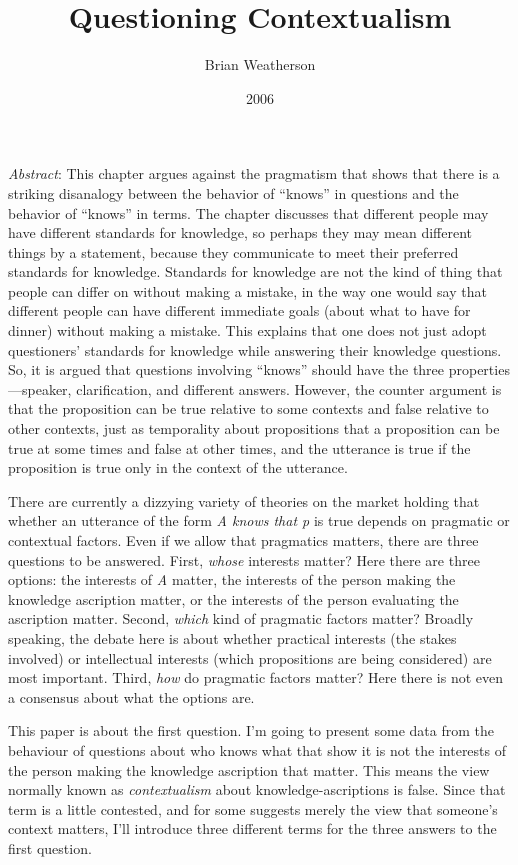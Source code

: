 \documentclass[
  11pt,
  letterpaper,
  DIV=11,
  numbers=noendperiod,
  twoside]{scrartcl}
\title{Questioning Contextualism}
\author{Brian Weatherson}
\date{2006}
\renewenvironment{abstract}
 {\vspace{-1.25cm}
 \quotation\small\noindent\emph{Abstract}:}
 {\endquotation}
\begin{document}
\maketitle
\begin{abstract}
This chapter argues against the pragmatism that shows that there is a
striking disanalogy between the behavior of ``knows'' in questions and
the behavior of ``knows'' in terms. The chapter discusses that different
people may have different standards for knowledge, so perhaps they may
mean different things by a statement, because they communicate to meet
their preferred standards for knowledge. Standards for knowledge are not
the kind of thing that people can differ on without making a mistake, in
the way one would say that different people can have different immediate
goals (about what to have for dinner) without making a mistake. This
explains that one does not just adopt questioners' standards for
knowledge while answering their knowledge questions. So, it is argued
that questions involving ``knows'' should have the three
properties---speaker, clarification, and different answers. However, the
counter argument is that the proposition can be true relative to some
contexts and false relative to other contexts, just as temporality about
propositions that a proposition can be true at some times and false at
other times, and the utterance is true if the proposition is true only
in the context of the utterance.
\end{abstract}


There are currently a dizzying variety of theories on the market holding
that whether an utterance of the form \emph{A knows that p} is true
depends on pragmatic or contextual factors. Even if we allow that
pragmatics matters, there are three questions to be answered. First,
\emph{whose} interests matter? Here there are three options: the
interests of \emph{A} matter, the interests of the person making the
knowledge ascription matter, or the interests of the person evaluating
the ascription matter. Second, \emph{which} kind of pragmatic factors
matter? Broadly speaking, the debate here is about whether practical
interests (the stakes involved) or intellectual interests (which
propositions are being considered) are most important. Third, \emph{how}
do pragmatic factors matter? Here there is not even a consensus about
what the options are.

This paper is about the first question. I'm going to present some data
from the behaviour of questions about who knows what that show it is not
the interests of the person making the knowledge ascription that matter.
This means the view normally known as \emph{contextualism} about
knowledge-ascriptions is false. Since that term is a little contested,
and for some suggests merely the view that someone's context matters,
I'll introduce three different terms for the three answers to the first
question.
\end{document}
